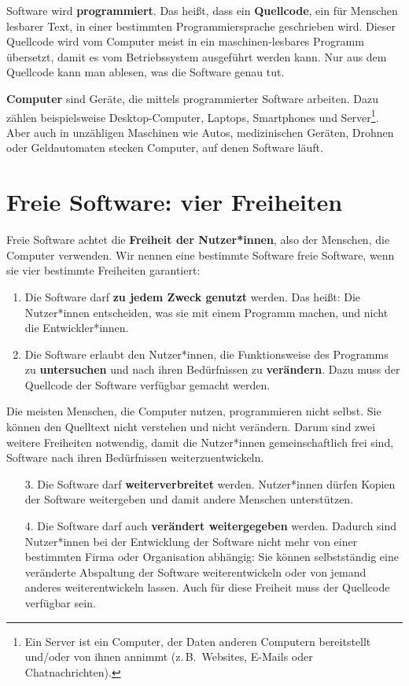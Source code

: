 \documentclass[a5paper,12pt]{scrartcl}
\begin{document}
Software wird \textbf{programmiert}. Das heißt, dass ein
\textbf{Quellcode}, ein für Menschen lesbarer Text, in einer
bestimmten Programmiersprache geschrieben wird. Dieser Quellcode wird
vom Computer meist in ein maschinen-lesbares Programm übersetzt, damit
es vom Betriebssystem ausgeführt werden kann. Nur aus dem Quellcode
kann man ablesen, was die Software genau tut.

\textbf{Computer} sind Geräte, die mittels programmierter Software
arbeiten. Dazu zählen beispielsweise Desktop-Computer, Laptops,
Smartphones und Server\footnote{Ein Server ist ein Computer, der Daten
  anderen Computern bereitstellt und/oder von ihnen annimmt (z.\,B.\
  Websites, E-Mails oder Chatnachrichten).}. Aber auch in unzähligen
Maschinen wie Autos, medizinischen Geräten, Drohnen oder Geldautomaten
stecken Computer, auf denen Software läuft.


\section{Freie Software: vier Freiheiten}

Freie Software achtet die \textbf{Freiheit der Nutzer*innen}, also der
Menschen, die Computer verwenden. Wir nennen eine bestimmte Software
freie Software, wenn sie vier bestimmte Freiheiten garantiert:
\begin{enumerate}
\item Die Software darf \textbf{zu jedem Zweck genutzt} werden. Das
  heißt: Die Nutzer*innen entscheiden, was sie mit einem Programm
  machen, und nicht die Entwickler*innen.
\item Die Software erlaubt den Nutzer*innen, die Funktionsweise des
  Programms zu \textbf{untersuchen} und nach ihren Bedürfnissen zu
  \textbf{verändern}. Dazu muss der Quellcode der Software verfügbar gemacht werden.
\end{enumerate}

Die meisten Menschen, die Computer nutzen, programmieren nicht
selbst. Sie können den Quelltext nicht verstehen und nicht
verändern. Darum sind zwei weitere Freiheiten notwendig, damit die
Nutzer*innen gemeinschaftlich frei sind, Software nach ihren
Bedürfnissen weiterzuentwickeln.

\begin{enumerate}
\item[3.] Die Software darf \textbf{weiterverbreitet}
  werden. Nutzer*innen dürfen Kopien der Software weitergeben und
  damit andere Menschen unterstützen.
\item[4.] Die Software darf auch \textbf{verändert weitergegeben}
  werden. Dadurch sind Nutzer*innen bei der Entwicklung der Software
  nicht mehr von einer bestimmten Firma oder Organisation abhängig:
  Sie können selbstständig eine veränderte Abspaltung der Software
  weiterentwickeln oder von jemand anderes weiterentwickeln
  lassen. Auch für diese Freiheit muss der Quellcode verfügbar sein.
\end{enumerate}
\end{document}
